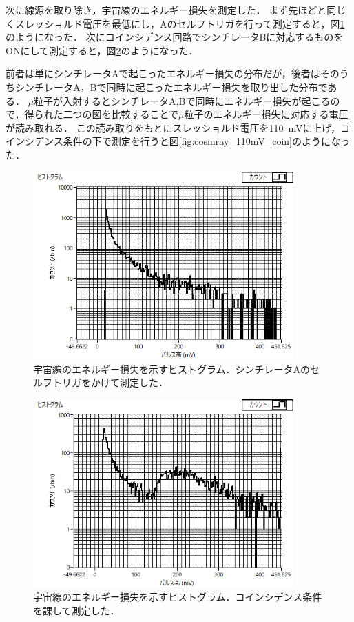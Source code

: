 \documentclass[a4paper,11pt]{jsarticle}
\begin{document}
次に線源を取り除き，宇宙線のエネルギー損失を測定した．
まず先ほどと同じくスレッショルド電圧を最低にし，Aのセルフトリガを行って測定すると，図\ref{fig:cosmray_low_aself}のようになった．
次にコインシデンス回路でシンチレータBに対応するものをONにして測定すると，図\ref{fig:cosmray_low_coin}のようになった．

前者は単にシンチレータAで起こったエネルギー損失の分布だが，後者はそのうちシンチレータA，Bで同時に起こったエネルギー損失を取り出した分布である．
$\mu$粒子が入射するとシンチレータA,Bで同時にエネルギー損失が起こるので，得られた二つの図を比較することで$\mu$粒子のエネルギー損失に対応する電圧が読み取れる．
この読み取りをもとにスレッショルド電圧を\SI{110}{\mV}に上げ，コインシデンス条件の下で測定を行うと図\ref{fig:cosmray_110mV_coin}のようになった．

\begin{figure}[htbp]
  \centering
  \includegraphics[width=10cm]{cosmray_low_aself.png}
  \caption{宇宙線のエネルギー損失を示すヒストグラム．シンチレータAのセルフトリガをかけて測定した．}
  \label{fig:cosmray_low_aself}
\end{figure}

\begin{figure}[htbp]
  \centering
  \includegraphics[width=10cm]{cosmray_low_coin.png}
  \caption{宇宙線のエネルギー損失を示すヒストグラム．コインシデンス条件を課して測定した．}
  \label{fig:cosmray_low_coin}
\end{figure}
\end{document}
